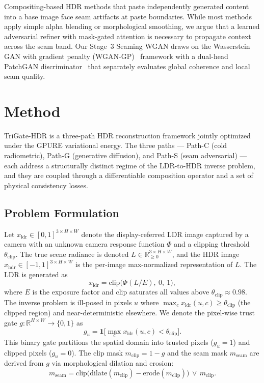 \documentclass[10pt,twocolumn,letterpaper]{article}
\newcommand{\xhdr}{x_{\mathrm{hdr}}}
\newcommand{\xldr}{x_{\mathrm{ldr}}}
\begin{document}
Compositing-based HDR methods that paste independently generated content into a base image face seam artifacts at paste boundaries. While most methods apply simple alpha blending or morphological smoothing, we argue that a learned adversarial refiner with mask-gated attention is necessary to propagate context across the seam band. Our Stage~3 Seaming WGAN draws on the Wasserstein GAN with gradient penalty (WGAN-GP)~\cite{wgangp} framework with a dual-head PatchGAN discriminator~\cite{pix2pix} that separately evaluates global coherence and local seam quality.

\section{Method}
\label{sec:method}

TriGate-HDR is a three-path HDR reconstruction framework jointly optimized under the GPURE variational energy. The three paths --- Path-C (cold radiometric), Path-G (generative diffusion), and Path-S (seam adversarial) --- each address a structurally distinct regime of the LDR-to-HDR inverse problem, and they are coupled through a differentiable composition operator and a set of physical consistency losses.

\subsection{Problem Formulation}

Let $\xldr \in [0,1]^{3\times H \times W}$ denote the display-referred LDR image captured by a camera with an unknown camera response function $\Phi$ and a clipping threshold $\theta_{\mathrm{clip}}$. The true scene radiance is denoted $L \in \mathbb{R}_{\geq 0}^{3\times H \times W}$, and the HDR image $\xhdr \in [-1,1]^{3\times H \times W}$ is the per-image max-normalized representation of $L$. The LDR is generated as
\begin{equation}
\xldr = \mathrm{clip}\big(\Phi(L / E),\ 0,\ 1\big),
\label{eq:ldr-formation}
\end{equation}
where $E$ is the exposure factor and $\mathrm{clip}$ saturates all values above $\theta_{\mathrm{clip}} \approx 0.98$. The inverse problem is ill-posed in pixels $u$ where $\max_c \xldr(u,c) \geq \theta_{\mathrm{clip}}$ (the clipped region) and near-deterministic elsewhere. We denote the pixel-wise trust gate $g : \mathbb{R}^{H\times W} \rightarrow \{0,1\}$ as
\begin{equation}
g_u = \mathbf{1}\big[\max_c \xldr(u,c) < \theta_{\mathrm{clip}}\big].
\label{eq:gate}
\end{equation}
This binary gate partitions the spatial domain into trusted pixels ($g_u=1$) and clipped pixels ($g_u=0$). The clip mask $m_{\mathrm{clip}} = 1-g$ and the seam mask $m_{\mathrm{seam}}$ are derived from $g$ via morphological dilation and erosion:
\begin{equation}
m_{\mathrm{seam}} = \mathrm{clip}\big(\mathrm{dilate}(m_{\mathrm{clip}}) - \mathrm{erode}(m_{\mathrm{clip}})\big) \,\vee\, m_{\mathrm{clip}}.
\label{eq:seam-mask}
\end{equation}
\end{document}
